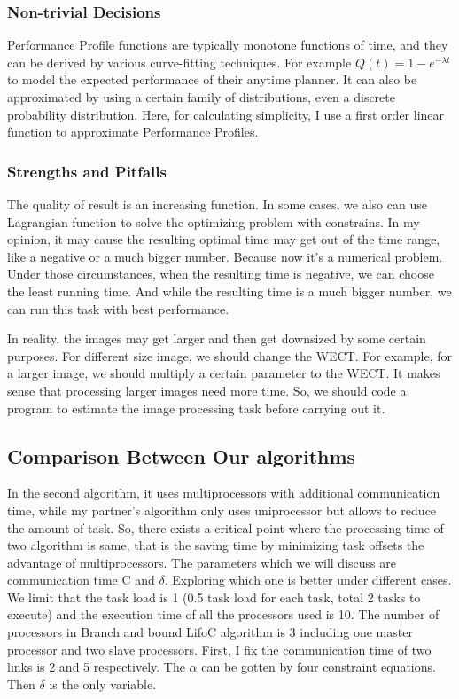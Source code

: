 \documentclass[twocolumn]{article}
\begin{document}
\subsubsection{Non-trivial Decisions}
Performance Profile functions are typically monotone functions of time, and they can be derived by various curve-fitting techniques. For example $Q(t)=1-e^{-\lambda t}$ to model the expected performance of their anytime planner. It can also be approximated by using a certain family of distributions, even a discrete probability distribution. Here, for calculating simplicity, I use a first order linear function to approximate Performance Profiles.

\subsubsection{Strengths and Pitfalls}
The quality of result is an increasing function. In some cases, we also can use Lagrangian function to solve the optimizing problem with constrains. In my opinion, it may cause the resulting optimal time may get out of the time range, like a negative or a much bigger number. Because now it's a numerical problem. Under those circumstances, when the resulting time is negative, we can choose the least running time. And while the resulting time is a much bigger number, we can run this task with best performance.

In reality, the images may get larger and then get downsized by some certain purposes. For different size image, we should change the WECT. For example, for a larger image, we should multiply a certain parameter to the WECT. It makes sense that processing larger images need more time. So, we should code a program to estimate the image processing task before carrying out it.



\subsection{Comparison Between Our algorithms}
In the second algorithm, it uses multiprocessors with additional communication time, while my partner’s algorithm only uses uniprocessor but allows to reduce the amount of task. So, there exists a critical point where the processing time of two algorithm is same, that is the saving time by minimizing task offsets the advantage of multiprocessors. The parameters which we will discuss are communication time C and $\delta$. Exploring which one is better under different cases.
We limit that the task load is 1 (0.5 task load for each task, total 2 tasks to execute) and the execution time of all the processors used is 10. The number of processors in Branch and bound LifoC algorithm is 3 including one master processor and two slave processors.
First, I fix the communication time of two links is 2 and 5 respectively. The $\alpha$ can be gotten by four constraint equations. Then $\delta$ is the only variable.
\end{document}
